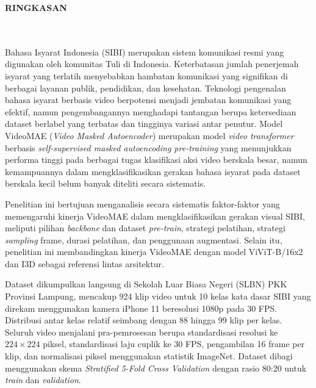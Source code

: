 \clearpage
{}%
\thispagestyle{fancy}

\begin{center}
	\large \bfseries \MakeUppercase{Ringkasan}\\
	\normalsize \normalfont {\thetitle}\\
	\normalsize \normalfont {\theauthor}\\
	\bigskip

	\normalsize \normalfont \justifying

	Bahasa Isyarat Indonesia (SIBI) merupakan sistem komunikasi resmi yang digunakan oleh komunitas Tuli di Indonesia. Keterbatasan jumlah penerjemah isyarat yang terlatih menyebabkan hambatan komunikasi yang signifikan di berbagai layanan publik, pendidikan, dan kesehatan. Teknologi pengenalan bahasa isyarat berbasis video berpotensi menjadi jembatan komunikasi yang efektif, namun pengembangannya menghadapi tantangan berupa ketersediaan dataset berlabel yang terbatas dan tingginya variasi antar penutur. Model VideoMAE (\textit{Video Masked Autoencoder}) merupakan model \textit{video transformer} berbasis \textit{self-supervised masked autoencoding pre-training} yang menunjukkan performa tinggi pada berbagai tugas klasifikasi aksi video berskala besar, namun kemampuannya dalam mengklasifikasikan gerakan bahasa isyarat pada dataset berskala kecil belum banyak diteliti secara sistematis.

	Penelitian ini bertujuan menganalisis secara sistematis faktor-faktor yang memengaruhi kinerja VideoMAE dalam mengklasifikasikan gerakan visual SIBI, meliputi pilihan \textit{backbone} dan dataset \textit{pre-train}, strategi pelatihan, strategi \textit{sampling} frame, durasi pelatihan, dan penggunaan augmentasi. Selain itu, penelitian ini membandingkan kinerja VideoMAE dengan model ViViT-B/16x2 dan I3D sebagai referensi lintas arsitektur.

	Dataset dikumpulkan langsung di Sekolah Luar Biasa Negeri (SLBN) PKK Provinsi Lampung, mencakup 924 klip video untuk 10 kelas kata dasar SIBI yang direkam menggunakan kamera iPhone 11 beresolusi 1080p pada 30 FPS. Distribusi antar kelas relatif seimbang dengan 88 hingga 99 klip per kelas. Seluruh video menjalani pra-pemrosesan berupa standardisasi resolusi ke $224\times224$ piksel, standardisasi laju cuplik ke 30 FPS, pengambilan 16 frame per klip, dan normalisasi piksel menggunakan statistik ImageNet. Dataset dibagi menggunakan skema \textit{Stratified 5-Fold Cross Validation} dengan rasio 80:20 untuk \textit{train} dan \textit{validation}.


\end{center}
